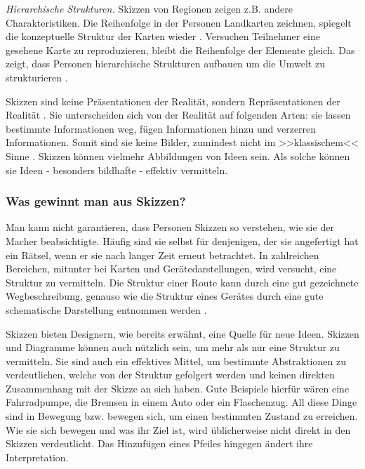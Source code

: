 \medskip \emph{Hierarchische Strukturen.} Skizzen von Regionen zeigen z.B. andere Charakteristiken. Die Reihenfolge in der Personen Landkarten zeichnen, spiegelt die konzeptuelle Struktur der Karten wieder \citep{Taylor:1992}. Versuchen Teilnehmer eine gesehene Karte zu reproduzieren, bleibt die Reihenfolge der Elemente gleich. Das zeigt, dass Personen hierarchische Strukturen aufbauen um die Umwelt zu strukturieren \citep{Tversky:2002}.

\medskip Skizzen sind keine Präsentationen der Realität, sondern Repräsentationen der Realität \citep{Tversky:1999}. Sie unterscheiden sich von der Realität auf folgenden Arten: sie lassen bestimmte Informationen weg, fügen Informationen hinzu und verzerren Informationen. Somit sind sie keine Bilder, zumindest nicht im >>klassischem<< Sinne \citep{Kosslyn:1980}. Skizzen können vielmehr Abbildungen von Ideen sein. Als solche können sie Ideen - besonders bildhafte - effektiv vermitteln.

\subsubsection{Was gewinnt man aus Skizzen?} Man kann nicht garantieren, dass Personen Skizzen so verstehen, wie sie der Macher beabsichtigte. Häufig sind sie selbst für denjenigen, der sie angefertigt hat ein Rätsel, wenn er sie nach langer Zeit erneut betrachtet. %
In zahlreichen Bereichen, mitunter bei Karten und Gerätedarstellungen, wird versucht, eine Struktur zu vermitteln. Die Struktur einer Route kann durch eine gut gezeichnete Wegbeschreibung, genauso wie die Struktur eines Gerätes durch eine gute schematische Darstellung entnommen werden \citep{Heiser:2002}.

\medskip Skizzen bieten Designern, wie bereits erwähnt, eine Quelle für neue Ideen. Skizzen und Diagramme können auch nützlich sein, um mehr als nur eine Struktur zu vermitteln. Sie sind auch ein effektives Mittel, um bestimmte Abstraktionen zu verdeutlichen, welche von der Struktur gefolgert werden und keinen direkten Zusammenhang mit der Skizze an sich haben. Gute Beispiele hierfür wären eine Fahrradpumpe, die Bremsen in einem Auto oder ein Flaschenzug. All diese Dinge sind in Bewegung bzw. bewegen sich, um einen bestimmten Zustand zu erreichen. Wie sie sich bewegen und was ihr Ziel ist, wird üblicherweise nicht direkt in den Skizzen verdeutlicht. Das Hinzufügen eines Pfeiles hingegen ändert ihre Interpretation.

